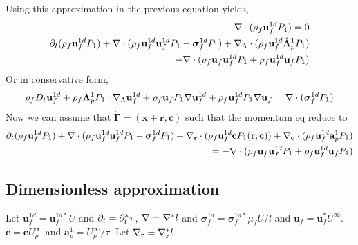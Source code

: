 \documentclass[11pt]{My_preprint}
\begin{document}
Using this approximation in the previous equation yields, 
\begin{align*}
    \mathbf{\nabla}\cdot (
        \rho_f  \textbf{u}_f^{1d} P_1 
        )
    = 
    0 \\
    \partial_t (\rho_f \textbf{u}_f^{1d}  P_1)
    + \mathbf{\nabla}\cdot (
         \rho_f \textbf{u}_f^{1d} \textbf{u}_f^{1d}  P_1
        - \bm\sigma_f^{1d} P_1
        )
    +  \mathbf{\nabla}_\Lambda \cdot ( \rho_f \textbf{u}_f^{1d} \dot{\bm\Lambda}_p^1  P_1 )\\
    = 
    - \mathbf{\nabla}\cdot (
         \rho_f \textbf{u}_f \textbf{u}_f^{1d}  P_1
        + \rho_f \textbf{u}_f^{1d} \textbf{u}_f  P_1
        )
\end{align*}
Or in conservative form, 
\begin{align*}
    \rho_f D_t \textbf{u}_f^{1d}  
    +  \rho_f  \dot{\bm\Lambda}_p^1  P_1   \cdot \mathbf{\nabla}_\Lambda \textbf{u}_f^{1d} 
    + \rho_f \textbf{u}_f  P_1 \mathbf{\nabla} \textbf{u}_f^{1d}
    +  \rho_f \textbf{u}_f^{1d} P_1 \mathbf{\nabla}\textbf{u}_f
    = 
    \mathbf{\nabla}\cdot ( \bm\sigma_f^{1d} P_1)
\end{align*}
Now we can assume that $\bm\dot{\Gamma} =(\textbf{x}+ \textbf{r},\textbf{c})$ such that the momentum eq reduce to 
\begin{align*}
    \partial_t (\rho_f \textbf{u}_f^{1d}  P_1)
    + \mathbf{\nabla}\cdot (
         \rho_f \textbf{u}_f^{1d} \textbf{u}_f^{1d}  P_1
        - \bm\sigma_f^{1d} P_1
        )
    +  \mathbf{\nabla}_\textbf{r} \cdot ( \rho_f \textbf{u}_f^{1d} \textbf{c}  P_1(\textbf{r},\textbf{c}) )
    +  \mathbf{\nabla}_\textbf{c} \cdot ( \rho_f \textbf{u}_f^{1d} \textbf{a}_p^1  P_1 )\\
    = 
    - \mathbf{\nabla}\cdot (
         \rho_f \textbf{u}_f \textbf{u}_f^{1d}  P_1
        + \rho_f \textbf{u}_f^{1d} \textbf{u}_f  P_1
        )
\end{align*}

\subsection{Dimensionless approximation}
Let $\textbf{u}^{1d}_f = \textbf{u}^{1d*}_f U$ and $\partial_t = \partial_t^* \tau$, $\mathbf{\nabla} = \mathbf{\nabla}^* l$ and $\bm\sigma^{1d}_f = \bm\sigma^{1d*}_f \mu_f U/l$ and $\textbf{u}_f = \textbf{u}_f^* U^\infty$.
$\textbf{c} = \textbf{c}U^\infty_p$ and $\textbf{a}_p^1 = U^\infty_p / \tau$. 
Let $\mathbf{\nabla}_\textbf{r} = \mathbf{\nabla}_\textbf{r}^* l$ 
\end{document}
